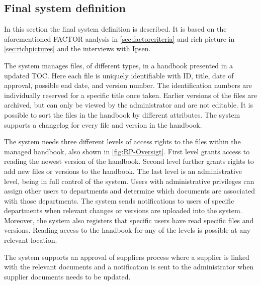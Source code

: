 \subsection{Final system definition}\label{sec:systemdefinition}
In this section the final system definition is described.
It is based on the aforementioned FACTOR analysis in \cref{sec:factorcriteria} and rich picture in \cref{sec:richpictures} and the interviews with Ipsen.

The system manages files, of different types, in a handbook presented in a updated TOC.
Here each file is uniquely identifiable with ID, title, date of approval, possible end date, and version number.
The identification numbers are individually reserved for a specific title once taken.
Earlier versions of the files are archived, but can only be viewed by the administrator and are not editable.
It is possible to sort the files in the handbook by different attributes.
The system supports a changelog for every file and version in the handbook.

The system needs three different levels of access rights to the files within the managed handbook, also shown in \cref{fig:RP-Oversigt}.
First level grants access to reading the newest version of the handbook.
Second level further grants rights to add new files or versions to the handbook.
The last level is an administrative level, being in full control of the system.
Users with administrative privileges can assign other users to departments and determine which documents are associated with those departments.
The system sends notifications to users of specific departments when relevant changes or versions are uploaded into the system.
Moreover, the system also registers that specific users have read specific files and versions.
Reading access to the handbook for any of the levels is possible at any relevant location.

The system supports an approval of suppliers process where a supplier is linked with the relevant documents and a notification is sent to the administrator when supplier documents needs to be updated.
